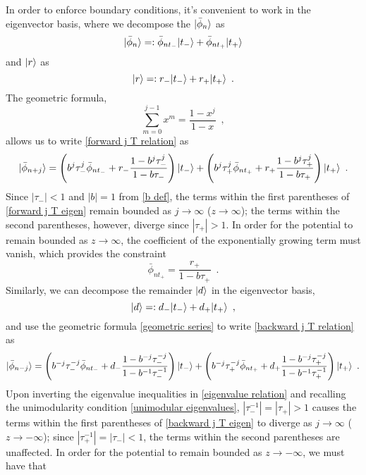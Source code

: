 In order to enforce boundary conditions, it's convenient to work in the eigenvector basis, where we decompose the $\lvert\bar\phi_n\rangle$ as
\begin{equation}
    \label{eigen decomp phi}
    \lvert\bar\phi_n\rangle=:\bar\phi_{n t_-}\lvert t_-\rangle + \bar\phi_{nt_+}\lvert t_+\rangle
\end{equation}
and $\lvert r\rangle$ as
\begin{equation}
    \label{eigen decomp r}
    \lvert r\rangle =: r_-\lvert t_-\rangle+r_+\lvert t_+\rangle
    \,\,\,.
\end{equation}
The geometric formula,
\begin{equation}
    \label{geometric series}
    \sum_{m=0}^{j-1} x^m = \frac{1-x^j}{1-x}
    \,\,\,,
\end{equation}
allows us to write \eqref{forward j T relation} as
\begin{equation}
    \label{forward j T eigen}
    \lvert\bar\phi_{n+j}\rangle = 
    \left( 
    b^j \tau_-^j\bar\phi_{nt_-} + r_-\frac{1-b^j\tau_-^j}{1-b\tau_-}
    \right)\lvert t_-\rangle
    +
    \left(
    b^j\tau_+^j\bar\phi_{nt_+}+r_+\frac{1-b^j\tau_+^j}{1-b\tau_+}
    \right)\lvert t_+\rangle
    \,\,\,.
\end{equation}
Since $|\tau_-|<1$ and $|b|=1$ from \eqref{b def}, the terms within the first parentheses of \eqref{forward j T eigen} remain bounded as $j\to\infty$ ($z\to\infty$); the terms within the second parentheses, however, diverge since $|\tau_+|>1$.  In order for the potential to remain bounded as $z\to\infty$, the coefficient of the exponentially growing term must vanish, which provides the constraint
\begin{equation}
    \label{forward BC}
    \bar\phi_{nt_+}=\frac{r_+}{1-b\tau_+}
    \,\,\,.
\end{equation}
Similarly, we can decompose the remainder $\lvert d\rangle$ in the eigenvector basis,
\begin{equation}
    \label{eigen decomp d}
    \lvert d\rangle=:d_-\lvert t_-\rangle + d_+\lvert t_+\rangle
    \,\,\,,
\end{equation}
and use the geometric formula \eqref{geometric series} to write \eqref{backward j T relation} as
\begin{equation}
    \label{backward j T eigen}
    \lvert\bar\phi_{n-j}\rangle = 
    \left(
    b^{-j}\tau_-^{-j}\bar\phi_{nt_-} + d_- \frac{1-b^{-j}\tau_-^{-j}}{1-b^{-1}\tau_-^{-1}}
    \right)
    \lvert t_-\rangle
    +
    \left(
    b^{-j}\tau_+^{-j}\bar\phi_{nt_+}
    +
    d_+\frac{1-b^{-j}\tau_+^{-j}}{1-b^{-1}\tau_+^{-1}}
    \right)
    \lvert t_+\rangle
    \,\,\,.
\end{equation}
Upon inverting the eigenvalue inequalities in \eqref{eigenvalue relation} and recalling the unimodularity condition \eqref{unimodular eigenvalues}, $|\tau_-^{-1}|=|\tau_+|>1$ causes the terms within the first parentheses of \eqref{backward j T eigen} to diverge as $j\to\infty$ ($z\to-\infty$); since $|\tau_+^{-1}|=|\tau_-|<1$, the terms within the second parentheses are unaffected.  In order for the potential to remain bounded as $z\to-\infty$, we must have that

